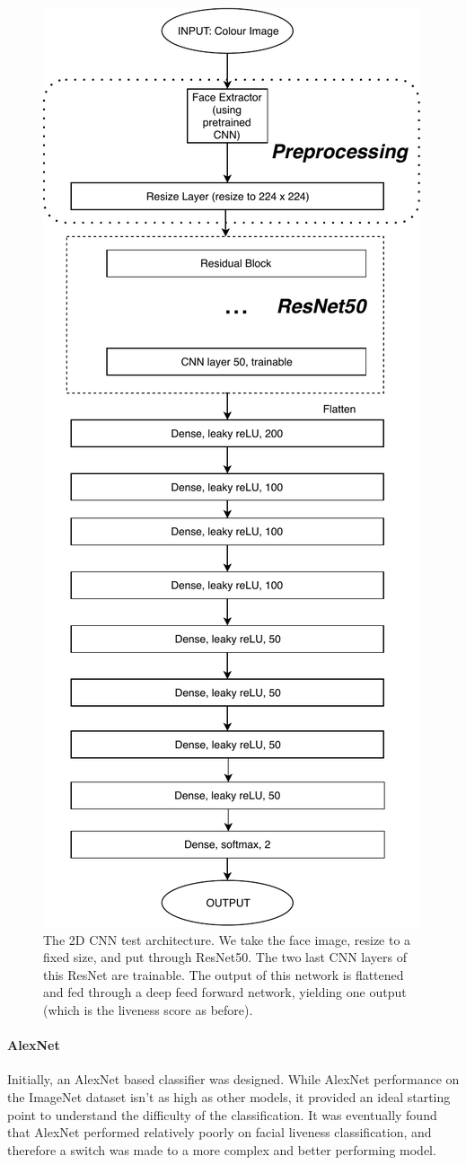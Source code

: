 \documentclass[11pt,a4paper]{article}
\begin{document}
                \begin{figure}
                    \centering
                    \includegraphics[width=0.5\linewidth]{2DCNNArchitecture.pdf}
                    \caption{The 2D CNN test architecture. We take the face image, resize to a fixed size, and put through ResNet50. The two last CNN layers
                    of this ResNet are trainable. The output of this network is flattened and fed through a deep feed forward network, yielding one output (which is the
                    liveness score as before).}
                    \label{2DCNNArchitecture}
                \end{figure}


                \paragraph{AlexNet}
                Initially, an AlexNet based classifier was designed. While AlexNet performance on the ImageNet dataset isn't as high as other models, it provided an ideal starting point to understand the difficulty
                of the classification. It was eventually found that AlexNet performed relatively poorly on facial liveness classification, and therefore a switch was made to a more complex and better performing model.
\end{document}

